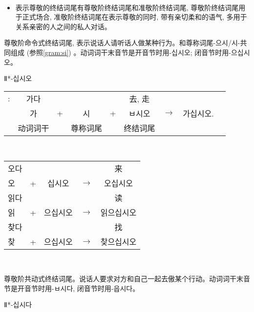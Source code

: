 \begin{grammar}
\begin{grammarsect}[尊敬阶终结词尾]
\begin{tabular}{|c|c|c|c|c|}
        \end{tabular}\\
        \begin{itemize}
            \item 表示尊敬的终结词尾有尊敬阶终结词尾和准敬阶终结词尾, 尊敬阶终结词尾用于正式场合, 准敬阶终结词尾在表示尊敬的同时, 带有亲切柔和的语气, 多用于关系亲密的人之间的私人对话。
        \end{itemize}
    \end{grammarsect}
    \begin{grammarsect}[\kr -ㅂ시오]\label{gram:bsio}
        \begin{itemize}
            \item 尊敬阶命令式终结词尾, 表示说话人请听话人做某种行为。和尊称词尾{\kr -으시/시-}共同组成 (参照\ref{gram:si}) 。动词词干末音节是开音节时用-십시오;
闭音节时用{\kr -으십시오}。 
            {\color{gray} \item Ⅱ*{\kr -십시오}} 
        \end{itemize}
        \begin{tabular}{ccccccccc}
            \kr \ruby{例}{예}:&\kr 가다&&&&去, 走\\
            &\kr 가&+&\kr 시&+&\kr ㅂ시오&$\to$&\kr 가십시오.\\\cline{2-2}\cline{4-4}\cline{6-6}
            &动词词干&&尊称词尾&&终结词尾
        \end{tabular}\\
        \begin{tabular}{lcccc}
            \kr 오다 &&&&来\\
            \kr 오 &+ &\kr 십시오&$\to$&\kr 오십시오\\
            \kr 읽다 &&&&读\\
            \kr 읽 &+&\kr 으십시오&$\to$&\kr 읽으십시오\\
            \kr 찾다 &&&&找 \\
            \kr 찾 &+ &\kr 으십시오&$\to$&\kr 찾으십시오 
        \end{tabular}\\
    \end{grammarsect}
    \begin{grammarsect}[\kr -(으){}ㅂ시다]
        \begin{itemize}
            \item 尊敬阶共动式终结词尾。说话人要求对方和自己一起去傲某个行动。动词词干末音节是开音节时用{\kr -ㅂ시다}, 闭音节时用{\kr -읍시다}。
            {\color{gray} \item Ⅱ*{\kr -십시다}} 

\end{itemize}
\end{grammarsect}
\end{grammar}
